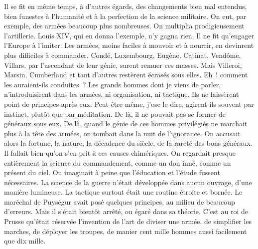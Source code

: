 \documentclass[french,twoside]{book} %
\begin{document}
Il se fit en même temps, à d’autres égards, des changements bien mal entendus, bien funestes à l’humanité et à la perfection de la science militaire. On eut, par exemple, des armées beaucoup plus nombreuses. On multiplia prodigieusement l’artillerie. Louis XIV, qui en donna l’exemple, n’y gagna rien. Il ne fit qu’engager l’Europe à l’imiter. Les armées, moins faciles à mouvoir et à nourrir, en devinrent plus difficiles à commander. Condé, Luxembourg, Eugène, Catinat, Vendôme, Villars, par l’ascendant de leur génie, surent remuer ces masses. Mais Villeroi, Marsin, Cumberland et tant d’autres restèrent écrasés sous elles. Eh ! comment les auraient-ils conduites ? Les grands hommes dont je viens de parler, n’introduisirent dans les armées, ni organisation, ni tactique. Ils ne laissèrent point de principes après eux. Peut-être même, j’ose le dire, agirent-ils souvent par instinct, plutôt que par méditation. De là, il ne pouvait pas se former de généraux sous eux. De là, quand le génie de ces hommes privilégiés ne marchait plus à la tête des armées, on tombait dans la nuit de l’ignorance. On accusait alors la fortune, la nature, la décadence du siècle, de la rareté des bons généraux. Il fallait bien qu’on s’en prit à ces causes chimériques. On regardait presque entièrement la science du commandement, comme un don inné, comme un présent du ciel. On imaginait à peine que l’éducation et l’étude fussent nécessaires. La science de la guerre n’était développée dans aucun ouvrage, d’une manière lumineuse. La tactique surtout était une routine étroite et bornée. Le maréchal de Puységur avait posé quelques principes, au milieu de beaucoup d’erreurs. Mais il s’était bientôt arrêté, ou égaré dans sa théorie. C’est au roi de Prusse qu’était réservée l’invention de l’art de diviser une armée, de simplifier les marches, de déployer les troupes, de manier cent mille hommes aussi facilement que dix mille.\par
\end{document}
